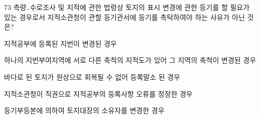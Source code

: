 \begin{question}{73}
측량․수로조사 및 지적에 관한 법령상 토지의 표시 변경에 관한 등기를 할 필요가 있는 경우로서 지적소관청이 관할 등기관서에 등기를 촉탁하여야 하는 사유가 아닌 것은?
\begin{choices}
  \item 지적공부에 등록된 지번이 변경된 경우
  \item 하나의 지번부여지역에 서로 다른 축척의 지적도가 있어 그 지역의 축척이 변경된 경우
  \item 바다로 된 토지가 원상으로 회복될 수 없어 등록말소 된 경우
  \item 지적소관청이 직권으로 지적공부의 등록사항 오류를 정정한 경우
  \item 등기부등본에 의하여 토지대장의 소유자를 변경한 경우
\end{choices}
\end{question}
